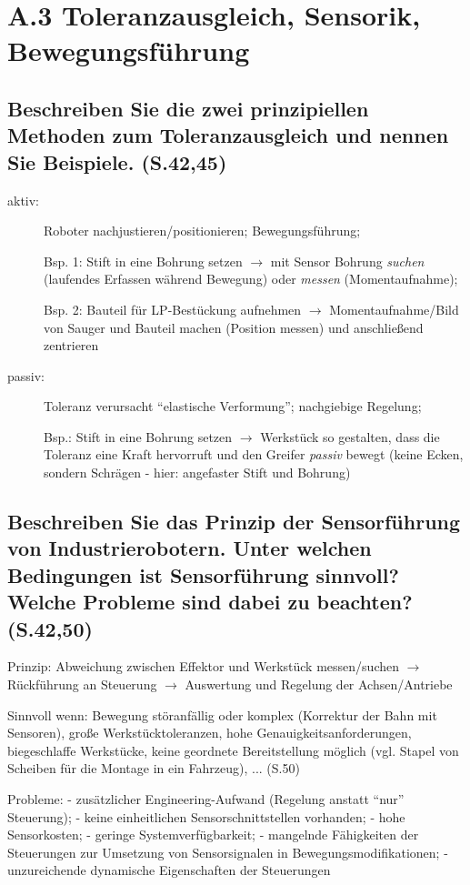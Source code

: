 \section*{A.3 Toleranzausgleich, Sensorik, Bewegungsführung}

\subsection{Beschreiben Sie die zwei prinzipiellen Methoden zum Toleranzausgleich und 
  nennen Sie Beispiele. (S.42,45)}
\begin{description}
\item[aktiv:] Roboter nachjustieren/positionieren; Bewegungsführung; 

  Bsp. 1: Stift in eine
  Bohrung setzen $\rightarrow$ mit Sensor Bohrung \emph{suchen} (laufendes Erfassen während 
  Bewegung) oder \emph{messen} (Momentaufnahme); 

  Bsp. 2: Bauteil für LP-Bestückung aufnehmen
  $\rightarrow$ Momentaufnahme/Bild von Sauger und Bauteil machen (Position messen) und 
  anschließend zentrieren
\item[passiv:] Toleranz verursacht ``elastische Verformung''; nachgiebige Regelung; 

  Bsp.: Stift in eine Bohrung
  setzen $\rightarrow$ Werkstück so gestalten, dass die Toleranz eine Kraft hervorruft und 
  den Greifer \emph{passiv} bewegt (keine Ecken, sondern Schrägen - hier: angefaster Stift
  und Bohrung)
\end{description}

\subsection{Beschreiben Sie das Prinzip der Sensorführung von Industrierobotern. Unter
  welchen Bedingungen ist Sensorführung sinnvoll? Welche Probleme sind dabei zu beachten? 
  (S.42,50)}
Prinzip: Abweichung zwischen Effektor und Werkstück messen/suchen $\rightarrow$ Rückführung
an Steuerung $\rightarrow$ Auswertung und Regelung der Achsen/Antriebe

Sinnvoll wenn: Bewegung störanfällig oder komplex (Korrektur der Bahn mit Sensoren), 
große Werkstücktoleranzen, hohe Genauigkeitsanforderungen, biegeschlaffe Werkstücke, 
keine geordnete Bereitstellung möglich (vgl. Stapel von Scheiben für die Montage in ein
Fahrzeug), ... (S.50)

Probleme: - zusätzlicher Engineering-Aufwand (Regelung anstatt ``nur'' Steuerung); - keine
einheitlichen Sensorschnittstellen vorhanden; - hohe Sensorkosten; - geringe 
Systemverfügbarkeit; - mangelnde Fähigkeiten der Steuerungen zur Umsetzung von
Sensorsignalen in Bewegungsmodifikationen; - unzureichende dynamische Eigenschaften der 
Steuerungen
